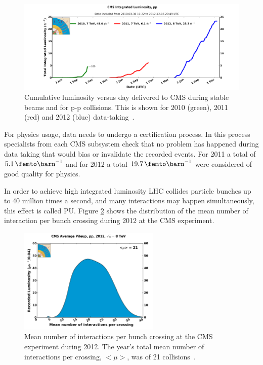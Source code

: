 \begin{figure}[!htb]
  \centering
  \includegraphics[width=1.00\textwidth]{Chapter02/CMS/Images/CMS_IntegratedLumi_pp_2010-2012}
  \caption[Cumulative luminosity versus day delivered to CMS during stable beams and for p-p collisions for 2010, 2011 and 2012 data-taking.]
  {Cumulative luminosity versus day delivered to CMS during stable beams and for p-p collisions. This is shown for 2010 (green), 2011 (red) and 2012 (blue) data-taking~\cite{IMAGEREF:CMSIntegratedLuminosity}.}
  \label{FIGURE:ExperimentalApparatus_CMS_IntegratedLumi_pp_2010-2012}
\end{figure}

For physics usage, data needs to undergo a certification process. In this process specialists from each \gls{CMS} subsystem check that no problem has happened during data taking that would bias or invalidate the recorded events. For 2011 a total of $5.1\,\femto\barn^{-1}$ and for 2012 a total $19.7\,\femto\barn^{-1}$ were considered of good quality for physics. 

In order to achieve high integrated luminosity \gls{LHC} collides particle bunches up to 40 million times a second, and many interactions may happen simultaneously, this effect is called \gls{PU}. Figure \ref{FIGURE:ExperimentalApparatus_CMS_PileIp_pp_2012} shows the distribution of the mean number of interaction per bunch crossing during 2012 at the \gls{CMS} experiment.

\begin{figure}[!htb]
  \centering
  \includegraphics[width=0.60\textwidth]{Chapter02/CMS/Images/CMS_PileIp_pp_2012}
  \caption[Mean number of interactions per bunch crossing at the CMS experiment during 2012.]
  {Mean number of interactions per bunch crossing at the CMS experiment during 2012. The year's total mean number of interactions per crossing, $<\mu>$, was of 21 collisions~\cite{IMAGEREF:CMSAveragePileUp2012}.}
  \label{FIGURE:ExperimentalApparatus_CMS_PileIp_pp_2012}
\end{figure}

